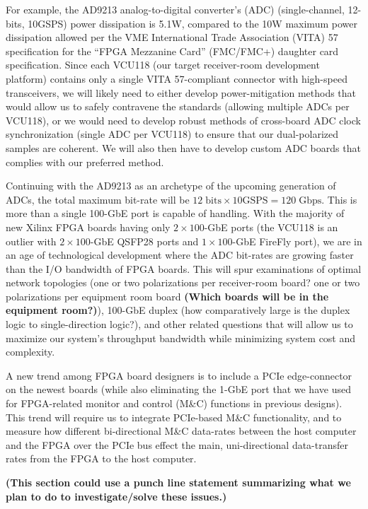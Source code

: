 \documentclass[10pt]{myNSF}
\begin{document}
For example, the AD9213 analog-to-digital converter’s (ADC)
(single-channel, 12-bits, 10GSPS) power dissipation is 5.1W, compared
to the 10W maximum power dissipation allowed per the VME International
Trade Association (VITA) 57 specification for the “FPGA Mezzanine
Card” (FMC/FMC+) daughter card specification. Since each VCU118 (our
target receiver-room development platform) contains only a single VITA
57-compliant connector with high-speed transceivers, we will likely
need to either develop power-mitigation methods that would allow us to
safely contravene the standards (allowing multiple ADCs per VCU118),
or we would need to develop robust methods of cross-board ADC clock
synchronization (single ADC per VCU118) to ensure that our
dual-polarized samples are coherent. We will also then have to develop
custom ADC boards that complies with our preferred method.

Continuing with the AD9213 as an archetype of the upcoming generation
of ADCs, the total maximum bit-rate will be $12\; \mathrm{bits} \times
10 \mathrm{GSPS} = 120\; \mathrm{Gbps}$. This is more than a single
100-GbE port is capable of handling.  With the majority of new Xilinx
FPGA boards having only $2 \times 100$-GbE ports (the VCU118 is an
outlier with $2 \times100$-GbE QSFP28 ports and $1 \times 100$-GbE
FireFly port), we are in an age of technological development where the
ADC bit-rates are growing faster than the I/O bandwidth of FPGA
boards. This will spur examinations of optimal network topologies (one
or two polarizations per receiver-room board? one or two polarizations
per equipment room board \textbf{(Which boards will be in the
  equipment room?)}), 100-GbE duplex (how comparatively large is the
duplex logic to single-direction logic?), and other related questions
that will allow us to maximize our system’s throughput bandwidth while
minimizing system cost and complexity.

A new trend among FPGA board designers is to include a PCIe
edge-connector on the newest boards (while also eliminating the 1-GbE
port that we have used for FPGA-related monitor and control (M\&C)
functions in previous designs). This trend will require us to
integrate PCIe-based M\&C functionality, and to measure how different
bi-directional M\&C data-rates between the host computer and the FPGA
over the PCIe bus effect the main, uni-directional data-transfer rates
from the FPGA to the host computer.

\textbf{(This section could use a punch line statement summarizing
  what we plan to do to investigate/solve these issues.)}
\end{document}
